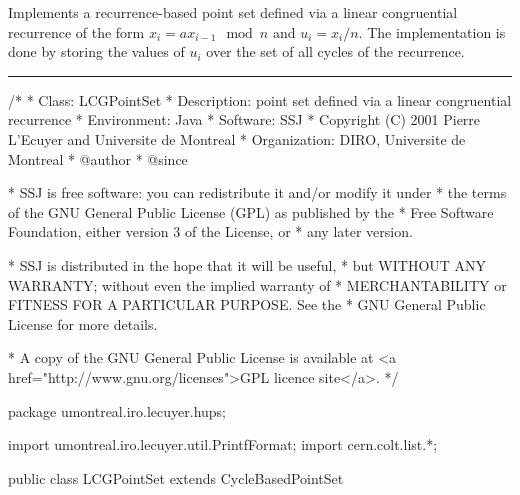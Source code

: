 
Implements a recurrence-based point set defined via a linear 
congruential recurrence of the form $x_i = a x_{i-1} \mod n$
and $u_i = x_i / n$.  The implementation is done by storing the values
of $u_i$ over the set of all cycles of the recurrence.
 

\bigskip\hrule\bigskip

\begin{code}
\begin{hide}
/*
 * Class:        LCGPointSet
 * Description:  point set defined via a linear congruential recurrence
 * Environment:  Java
 * Software:     SSJ 
 * Copyright (C) 2001  Pierre L'Ecuyer and Universite de Montreal
 * Organization: DIRO, Universite de Montreal
 * @author       
 * @since

 * SSJ is free software: you can redistribute it and/or modify it under
 * the terms of the GNU General Public License (GPL) as published by the
 * Free Software Foundation, either version 3 of the License, or
 * any later version.

 * SSJ is distributed in the hope that it will be useful,
 * but WITHOUT ANY WARRANTY; without even the implied warranty of
 * MERCHANTABILITY or FITNESS FOR A PARTICULAR PURPOSE.  See the
 * GNU General Public License for more details.

 * A copy of the GNU General Public License is available at
   <a href="http://www.gnu.org/licenses">GPL licence site</a>.
 */
\end{hide}
package umontreal.iro.lecuyer.hups;\begin{hide}
import umontreal.iro.lecuyer.util.PrintfFormat;
import cern.colt.list.*;
\end{hide}

public class LCGPointSet extends CycleBasedPointSet \begin{hide} {

      private int a;                      // Multiplier.

\end{hide}
\end{code}

